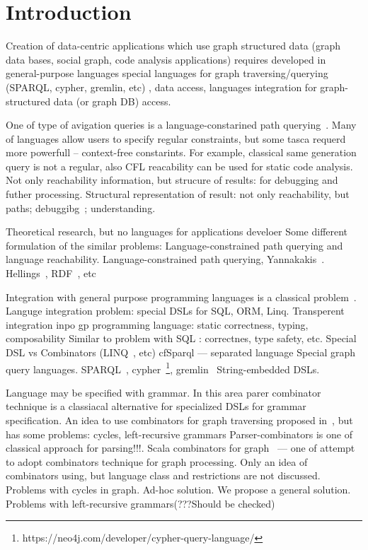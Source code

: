 \section{Introduction}

Creation of data-centric applications which use graph structured data (graph data bases, social graph, code analysis applications) requires 
developed in general-purpose languages 
special languages for graph traversing/querying (SPARQL, cypher, gremlin, etc)
, data access, languages integration for graph-structured data (or graph DB) access.

One of type of avigation queries is a language-constarined path querying~\cite{!!!}.
Many of languages allow users to specify regular constraints, but some tasca requerd more powerfull -- context-free constarints.
For example, classical same generation query is not a regular, also CFL reacability can be used for static code analysis.
Not only reachability information, but strucure of results: for debugging and futher processing.
Structural representation of result: not only reachability, but paths; debuggibg~\cite{structForDebugging}; understanding.

Theoretical research, but no languages for applications develoer
Some different formulation of the similar problems: Language-constrained path querying and language reachability.
Language-constrained path querying, Yannakakis~\cite{Yannakakis}. 
Hellings~\cite{ConjCFPathQuery, Hellings16}, RDF~\cite{CFGonRDF}, etc~\cite{QueryGraphWithData, RegularDBQuery, GraphQueryWithEarley, FLCpathProblem, graphDB}


Integration with general purpose programming languages is a classical problem~\cite{stringEmbeddedLanguagesProblem}.
Languge integration problem: special DSLs for SQL, ORM, Linq.
Transperent integration inpo gp programming language: static correctness, typing, composability
Similar to problem with SQL : correctnes, type safety, etc. Special DSL vs Combinators (LINQ~\cite{LINQ1, LINQ2}, etc)
cfSparql --- separated language
Special graph query languages. SPARQL~\cite{sparql}, cypher~\footnote{https://neo4j.com/developer/cypher-query-language/}, gremlin~\cite{gremlin}
String-embedded DSLs.


Language may be specified with grammar.
In this area parer combinator technique is a classiacal alternative for specialized DSLs for grammar specification. 
An idea to use combinators for graph traversing proposed in~\cite{ScalaGraphParsing}, but has some problems: cycles, left-recursive grammars
Parser-combinators is one of classical approach for parsing!!!.
Scala combinators for graph~\cite{ScalaGraphParsing} --- one of attempt to adopt combinators technique for graph processing.
Only an idea of combinators using, but language class and restrictions are not discussed.
Problems with cycles in graph. 
Ad-hoc solution.
We propose a general solution.
Problems with left-recursive grammars(???Should be checked)

